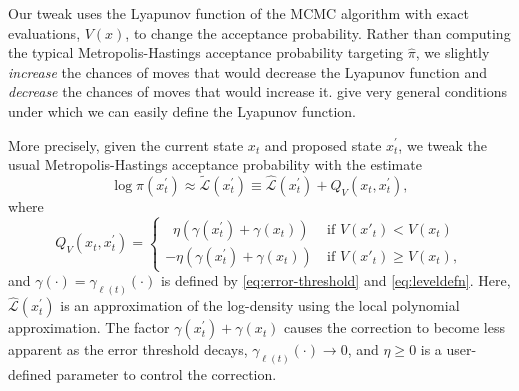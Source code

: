 Our tweak uses the Lyapunov function of the MCMC algorithm with exact evaluations, $V(x)$, to change the acceptance probability. Rather than computing the typical Metropolis-Hastings acceptance probability targeting $\hat{\pi}$, we slightly \textit{increase} the chances of moves that would decrease the Lyapunov function and \textit{decrease} the chances of moves that would increase it. \citet{roberts1996geometric} give very general conditions under which we can easily define the Lyapunov function.

More precisely, given the current state $x_t$ and proposed state $x^{\prime}_t$, we tweak the usual Metropolis-Hastings acceptance probability with the estimate 
\begin{equation}
    \log{\pi(x^{\prime}_t)} \approx \widetilde{\mathcal{L}}(x^{\prime}_t) \equiv \widehat{\mathcal{L}}(x^{\prime}_t) + Q_V(x_t, x^{\prime}_t),
    \label{eq:Lypunov-correction}
\end{equation}
where 
%
\begin{equation}
    Q_V(x_t, x^{\prime}_t) = \begin{cases}
    \ \, \, \eta (\gamma(x^{\prime}_t) + \gamma(x_t))   & \mbox{if } V(x'_t) < V(x_t)\\
    - \eta(\gamma(x^{\prime}_t) + \gamma(x_t)) \ & \mbox{if } V(x'_t) \geq V(x_t),
    \end{cases}
    \label{EqQvDef}
\end{equation} 
and $\gamma(\cdot) = \gamma_{\ell(t)}(\cdot)$ is defined by \eqref{eq:error-threshold} and \eqref{eq:leveldefn}. Here, $\widehat{\mathcal{L}}(x^{\prime}_t)$ is an approximation of the log-density using the local polynomial approximation. The factor $\gamma(x^{\prime}_t) + \gamma(x_t)$ causes the correction to become less apparent as the error threshold decays, 
$\gamma_{\ell(t)}(\cdot) \to 0$,
and $\eta \geq 0$ is a user-defined parameter to control the correction. 

